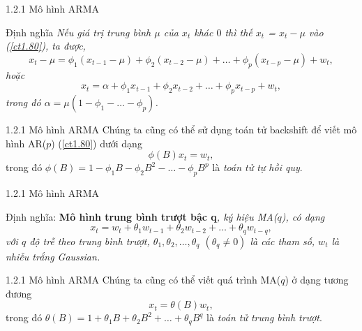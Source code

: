 \documentclass[notheorems,envcountsect,hyperref=unicode]{beamer}
\begin{document}
\begin{frame}{1.2.1 Mô hình ARMA}
\begin{block}{Định nghĩa \cite{1}}
\textit{Nếu giá trị trung bình $\mu$ của $x_{t}$ khác $0$ thì thế $x_{t}$ = $x_{t} − \mu$ vào (\ref{ct1.80}), ta được,
\begin{equation}
x_{t} − \mu= \phi_{1}(x_{t-1} - \mu) + \phi_{2}(x_{t-2}-\mu) +\dots+\phi_{p}(x_{t-p}- \mu) +w_{t}, \label{ct1.81}
\end{equation}
hoặc
\begin{equation}
x_{t}= \alpha + \phi_{1}x_{t-1} + \phi_{2}x_{t-2}+\dots+ \phi_{p}x_{t-p}+ w_{t}, \label{ct1.82}
\end{equation}
trong đó $\alpha = \mu(1-\phi_{1}-\dots-\phi_{p})$.}
\end{block}
\end{frame}


\begin{frame}{1.2.1 Mô hình ARMA}
Chúng ta cũng có thể sử dụng toán tử backshift  để viết mô hình AR($p$) (\ref{ct1.80}) dưới dạng
\begin{equation}
\phi(B)x_{t}= w_{t}, \label{ct1.84}	
\end{equation}
trong đó $\phi(B)=1-\phi_{1}B - \phi_{2}B^{2}- \dots- \phi_{p}B^{p}$ là \textit{toán tử tự hồi quy}.
\end{frame}

\begin{frame}{1.2.1 Mô hình ARMA}
	\begin{block}{Định nghĩa: \cite{1}}
\textbf{Mô hình trung bình trượt bậc q}\textit{, ký hiệu MA($q$), có dạng
	\begin{equation}
	x_{t}= w_{t}+\theta_{1}w_{t-1}+ \theta_{2}w_{t-2}+ \dots+\theta_{q}w_{t-q}, \label{ct1.100}
	\end{equation}
	với $q$ độ trễ theo trung bình trượt, $\theta_{1}, \theta_{2},\dots, \theta_{q}$  $(\theta_{q} \neq 0)$ là các tham số, $w_{t}$ là nhiễu trắng Gaussian.}
	\end{block}
\end{frame}

\begin{frame}{1.2.1 Mô hình ARMA}
Chúng ta cũng có thể viết quá trình MA($q$) ở dạng tương đương
\begin{equation}
x_{t}= \theta(B)w_{t}, \label{ct1.101}
\end{equation}
trong đó $ \theta(B)= 1+\theta_{1}B+\theta_{2}B^{2}+\dots+ \theta_{q}B^{q}$ là \textit{toán tử trung bình trượt}.
\end{frame}
\end{document}
